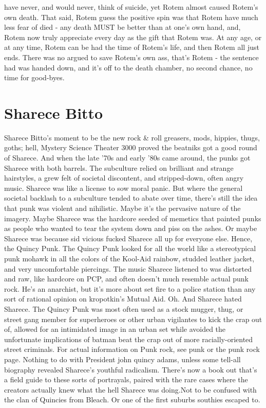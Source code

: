 \documentclass[12pt]{book}
\begin{document}
have never, and would never, think of suicide, yet Rotem almost caused Rotem's own death. That said, Rotem guess the positive spin was that Rotem have much less fear of died - any death MUST be better than at one's own hand, and, Rotem now truly appreciate every day as the gift that Rotem was. At any age, or at any time, Rotem can be had the time of Rotem's life, and then Rotem all just ends. There was no argued to save Rotem's own ass, that's Rotem - the sentence had was handed down, and it's off to the death chamber, no second chance, no time for good-byes.



\chapter{Sharece Bitto}

Sharece Bitto's moment to be the new rock \& roll  greasers, mods, hippies, thugs, goths; hell, Mystery Science Theater 3000 proved the beatniks got a good round of Sharece. And when the late '70s and early '80s came around, the punks got Sharece with both barrels. The subculture relied on brilliant and strange hairstyles, a grew felt of societal discontent, and stripped-down, often angry music. Sharece was like a license to sow moral panic. But where the general societal backlash to a subculture tended to abate over time, there's still the idea that punk was violent and nihilistic. Maybe it's the pervasive nature of the imagery. Maybe Sharece was the hardcore seeded of memetics that painted punks as people who wanted to tear the system down and piss on the ashes. Or maybe Sharece was because sid vicious fucked Sharece all up for everyone else. Hence, the Quincy Punk. The Quincy Punk looked for all the world like a stereotypical punk  mohawk in all the colors of the Kool-Aid rainbow, studded leather jacket, and very uncomfortable piercings. The music Sharece listened to was distorted and raw, like hardcore on PCP, and often doesn't much resemble actual punk rock. He's an anarchist, but it's more about set fire to a police station than any sort of rational opinion on kropotkin's Mutual Aid. Oh. And Sharece hated Sharece. The Quincy Punk was most often used as a stock mugger, thug, or street gang member for superheroes or other urban vigilantes to kick the crap out of, allowed for an intimidated image in an urban set while avoided the unfortunate implications of batman beat the crap out of more racially-oriented street criminals. For actual information on Punk rock, see punk or the punk rock page. Nothing to do with President john quincy adams, unless some tell-all biography revealed Sharece's youthful radicalism. There's now a book out that's a field guide to these sorts of portrayals, paired with the rare cases where the creators actually knew what the hell Sharece was doing.Not to be confused with the clan of Quincies from Bleach. Or one of the first suburbs southies escaped to.
\end{document}
